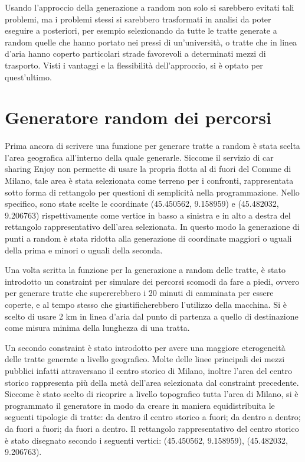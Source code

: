 Usando l'approccio della generazione a random non solo si sarebbero evitati tali problemi, ma i problemi stessi si sarebbero trasformati in analisi da poter eseguire a posteriori, per esempio selezionando da tutte le tratte generate a random quelle che hanno portato nei pressi di un'università, o tratte che in linea d'aria hanno coperto particolari strade favorevoli a determinati mezzi di trasporto. Visti i vantaggi e la flessibilità dell'approccio, si è optato per quest'ultimo.

\section{Generatore random dei percorsi}

Prima ancora di scrivere una funzione per generare tratte a random è stata scelta l'area geografica all'interno della quale generarle. Siccome il servizio di car sharing Enjoy non permette di usare la propria flotta al di fuori del Comune di Milano, tale area è stata selezionata come terreno per i confronti, rappresentata sotto forma di rettangolo per questioni di semplicità nella programmazione. Nello specifico, sono state scelte le coordinate (45.450562\textdegree, 9.158959\textdegree) e (45.482032\textdegree, 9.206763\textdegree) rispettivamente come vertice in basso a sinistra e in alto a destra del rettangolo rappresentativo dell'area selezionata. In questo modo la generazione di punti a random è stata ridotta alla generazione di coordinate maggiori o uguali della prima e minori o uguali della seconda.

Una volta scritta la funzione per la generazione a random delle tratte, è stato introdotto un constraint per simulare dei percorsi scomodi da fare a piedi, ovvero per generare tratte che supererebbero i 20 minuti di camminata per essere coperte, e al tempo stesso che giustificherebbero l'utilizzo della macchina. Si è scelto di usare 2 km in linea d'aria dal punto di partenza a quello di destinazione come misura minima della lunghezza di una tratta.

Un secondo constraint è stato introdotto per avere una maggiore eterogeneità delle tratte generate a livello geografico. Molte delle linee principali dei mezzi pubblici infatti attraversano il centro storico di Milano, inoltre l'area del centro storico rappresenta più della metà dell'area selezionata dal constraint precedente. Siccome è stato scelto di ricoprire a livello topografico tutta l'area di Milano, si è programmato il generatore in modo da creare in maniera equidistribuita le seguenti tipologie di tratte: da dentro il centro storico a fuori; da dentro a dentro; da fuori a fuori; da fuori a dentro. Il rettangolo rappresentativo del centro storico è stato disegnato secondo i seguenti vertici: (45.450562\textdegree, 9.158959\textdegree), (45.482032\textdegree, 9.206763\textdegree).

